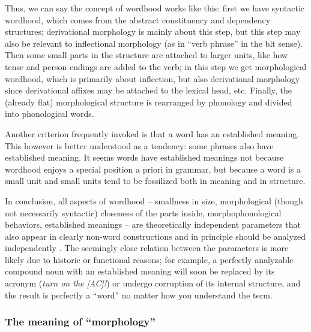 \documentclass[UTF8, a4paper, oneside, scheme=plain, 12pt]{ctexbook}
\newcommand{\form}[1]{\emph{#1}}
\begin{document}
{Thus, we can say the concept of wordhood works like this: 
first we have syntactic wordhood, 
which comes from the abstract constituency and dependency structures; 
derivational morphology is mainly about this step, 
but this step may also be relevant to inflectional morphology
(as in ``verb phrase'' in the \acs{blt} sense). 
Then some small parts in the structure 
are attached to larger units, like how tense and person endings are added to the verb; 
in this step we get morphological wordhood, 
which is primarily about inflection, 
but also derivational morphology 
since derivational affixes may be attached to the lexical head, etc.
Finally, the (already flat) morphological structure is rearranged 
by phonology and divided into phonological words.

Another criterion frequently invoked is that 
a word has an established meaning.
This however is better understood as a tendency:
some phrases also have established meaning.
It seems words have established meanings not because 
wordhood enjoys a special position a priori in grammar, 
but because a word is a small unit 
and small units tend to be fossilized both in meaning and in structure.

In conclusion, all aspects of wordhood -- 
smallness in size, 
morphological (though not necessarily syntactic) closeness of the parts inside, 
morphophonological behaviors, 
established meanings -- 
are theoretically independent parameters that also appear in clearly non-word constructions 
and in principle should be analyzed independently
\citep{harley1999distributed}.
The seemingly close relation between the parameters 
is more likely due to historic or functional reasons;
for example, a perfectly analyzable compound noun with an established meaning 
will soon be replaced by its acronym (\form{turn on the [AC]!}) 
or undergo corruption of its internal structure, 
and the result is perfectly a ``word'' no matter how you understand the term.

\subsubsection{The meaning of ``morphology''}

}
\end{document}
